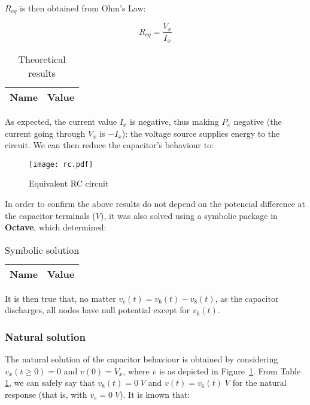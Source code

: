 $R_{eq}$ is then obtained from Ohm's Law:

\begin{equation}
  R_{eq} = \frac{V_x}{I_x}
\end{equation}

\begin{table}[H]
  \centering
  \begin{tabular}{|c|c|}
    \hline
        {\bf Name} & {\bf Value} \\
        \hline
        \hline
        
        \hline
  \end{tabular}
  \caption{Theoretical results}
\end{table}

As expected, the current value $I_x$ is negative, thus making $P_x$ negative (the current going through $V_x$ is $-I_x$): the voltage source supplies energy to the circuit. We can then reduce the capacitor's behaviour to:

\begin{figure}[H]
  \centering
  \texttt{[image: rc.pdf]}
  \caption{Equivalent RC circuit}
  \label{rc_fig}
\end{figure}

In order to confirm the above results do not depend on the potencial difference at the capacitor terminals ($V$), it was also solved using a symbolic package in \textbf{Octave}, which determined:

\begin{table}[H]
  \centering
  \begin{tabular}{|c|c|}
    \hline
        {\bf Name} & {\bf Value} \\
        \hline
        \hline
        
        \hline
  \end{tabular}
  \caption{Symbolic solution}
  \label{sym}
\end{table}

It is then true that, no matter $v_c(t)=v_6(t)-v_8(t)$, as the capacitor discharges, all nodes have null potential except for $v_6(t)$.

\subsubsection{Natural solution}

The natural solution of the capacitor behaviour is obtained by considering $v_x(t\geq0)=0$ and $v(0)=V_x$, where $v$ is as depicted in Figure~\ref{rc_fig}. From Table \ref{sym}, we can safely say that $v_8(t)=0\;V$ and $v(t)=v_6(t)\;V$ for the natural response (that is, with $v_s=0\;V$). It is known that:

